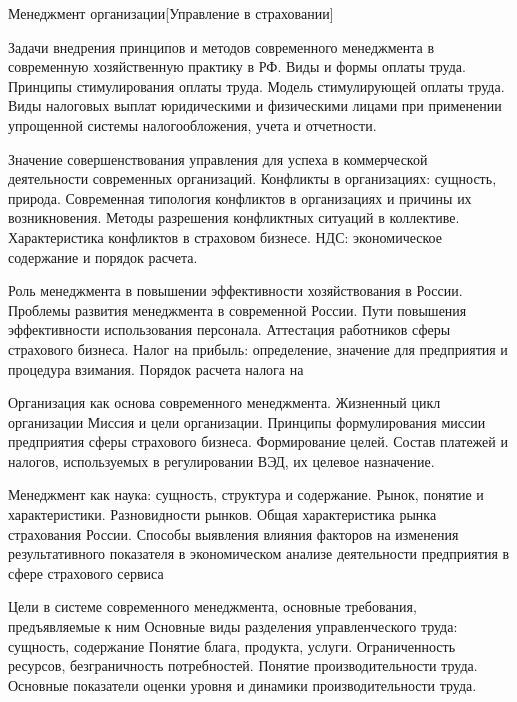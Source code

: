 \documentclass[
	11pt,
	a4paper,
	]
	{article}
\begin{document}
 {Менеджмент организации}[Управление в страховании]

	

\noindent{} 
	{
		Задачи внедрения принципов и методов современного менеджмента в современную хозяйственную практику в РФ.
	}{
		Виды и формы оплаты труда. Принципы стимулирования оплаты труда. Модель стимулирующей оплаты труда.
	}{
		Виды налоговых выплат юридическими и физическими лицами при применении упрощенной системы налогообложения, учета и отчетности.
	}

\bigskip

\noindent{} 
	{
		Значение совершенствования управления для успеха в коммерческой деятельности современных организаций.
	}{
		Конфликты в организациях: сущность, природа. Современная типология конфликтов в организациях и причины их возникновения. Методы разрешения конфликтных ситуаций в коллективе. Характеристика конфликтов в страховом бизнесе.
	}{
		НДС: экономическое содержание и порядок расчета.
	}

\bigskip

\noindent{} 
	{
		Роль менеджмента в повышении эффективности хозяйствования в России. Проблемы развития менеджмента в современной России.
	}{
		Пути повышения эффективности использования персонала. Аттестация работников сферы страхового бизнеса.
	}{
		Налог на прибыль: определение, значение для предприятия и процедура взимания. Порядок расчета налога на
	}

\bigskip

\noindent{} 
	{
		Организация как основа современного менеджмента. Жизненный цикл организации
	}{
		Миссия и цели организации. Принципы формулирования миссии предприятия сферы страхового бизнеса. Формирование целей.
	}{
		Состав платежей и налогов, используемых в регулировании ВЭД, их целевое назначение.
	}

\bigskip

\noindent{} 
	{
		Менеджмент как наука: сущность, структура и содержание.
	}{
		Рынок, понятие и характеристики. Разновидности рынков. Общая характеристика рынка страхования России.
	}{
		Способы выявления влияния факторов на изменения результативного показателя в экономическом анализе деятельности предприятия в сфере страхового сервиса
	}

\bigskip

\noindent{} 
	{
		Цели в системе современного менеджмента, основные требования, предъявляемые к ним Основные виды разделения управленческого труда: сущность, содержание
	}{
		Понятие блага, продукта, услуги. Ограниченность ресурсов, безграничность потребностей.
	}{
		Понятие производительности труда. Основные показатели оценки уровня и динамики производительности труда.
	}
\end{document}
